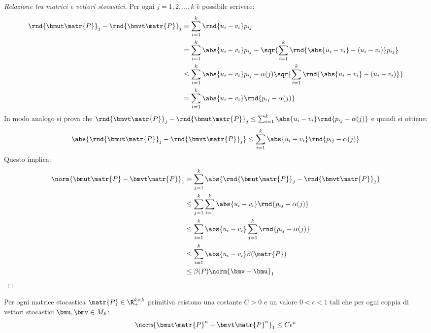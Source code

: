 \documentclass[\main/main.tex]{subfiles}
\begin{document}
\begin{proof}[Relazione tra matrici e vettori stocastici]
  Per ogni \(j = 1, 2, \ldots, k\) è possibile scrivere:
  \begin{align*}
    \rnd{\bmut \matr{P}}_j - \rnd{\bmvt \matr{P}}_j & = \sum_{i=1}^k \rnd{u_i - v_i}p_{ij}                                                                       \\
                                                    & = \sum_{i=1}^k \abs{u_i - v_i}p_{ij} - \sqr{\sum_{i=1}^k \rnd{\abs{u_i - v_i} - (u_i - v_i)}p_{ij}}        \\
                                                    & \leq \sum_{i=1}^k \abs{u_i - v_i}p_{ij} - \alpha(j) \sqr{\sum_{i=1}^k \rnd{\abs{u_i - v_i} - (u_i - v_i)}} \\
                                                    & = \sum_{i=1}^k \abs{u_i - v_i}\rnd{p_{ij} - \alpha(j)}                                                     \\
  \end{align*}
  In modo analogo si prova che \(\rnd{\bmvt \matr{P}}_j - \rnd{\bmut \matr{P}}_j \leq \sum_{i=1}^k \abs{u_i - v_i}\rnd{p_{ij} - \alpha(j)}\) e quindi si ottiene:
  \[
    \abs{\rnd{\bmut \matr{P}}_j - \rnd{\bmvt \matr{P}}_j} \leq \sum_{i=1}^k \abs{u_i - v_i}\rnd{p_{ij} - \alpha(j)}
  \]
  Questo implica:
  \begin{align*}
    \norm{\bmut \matr{P} - \bmvt \matr{P}}_1 & = \sum_{j=1}^k \abs{\rnd{\bmut \matr{P}}_j - \rnd{\bmvt \matr{P}}_j}    \\
                                             & \leq \sum_{j=1}^k \sum_{i=1}^k \abs{u_i - v_i}\rnd{p_{ij} - \alpha(j)}  \\
                                             & \leq \sum_{i=1}^k \abs{u_i - v_i} \sum_{j=1}^k \rnd{p_{ij} - \alpha(j)} \\
                                             & \leq \sum_{i=1}^k \abs{u_i - v_i} \beta(\matr{P})                       \\
                                             & \leq \beta(P) \norm{\bmv - \bmu}_1
  \end{align*}
\end{proof}
\clearpage


\begin{theorem}
  Per ogni matrice stocastica \(\matr{P} \in \R^{k\times k}_+\) primitiva esistono una costante \(C > 0\) e un valore \(0< \epsilon <1\) tali che per ogni coppia di vettori stocastici \(\bmu, \bmv \in M_k\):
  \[
    \norm{\bmut \matr{P}^n - \bmvt \matr{P}^n}_1 \leq C\epsilon^n
  \]
\end{theorem}
\end{document}
